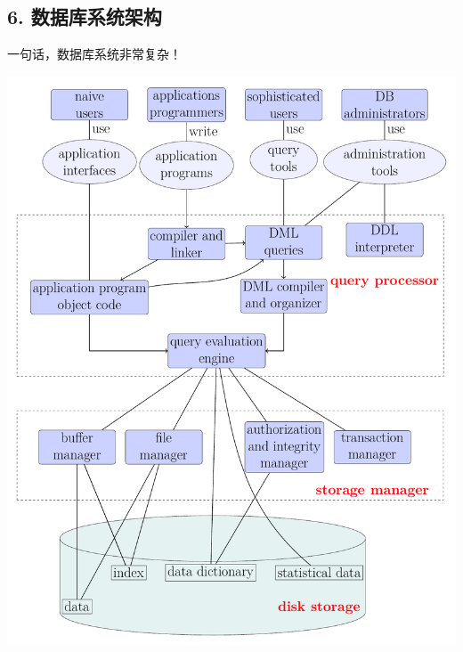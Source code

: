 \documentclass[aspectratio=169, 14pt]{beamer}
\begin{document}
\begin{frame}
	\section{\textcolor{darkmidnightblue}{6. 数据库系统架构}}
	一句话，数据库系统非常复杂！
\end{frame}

\begin{frame}
	\begin{center}
		\includegraphics[height=.99\paperheight]{image/system}
	\end{center}



\end{frame}
\end{document}
